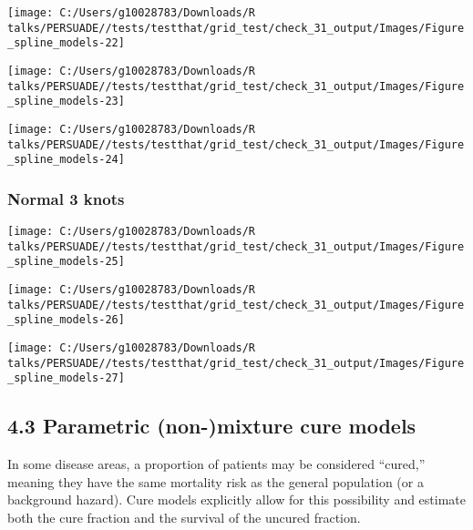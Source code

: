 \documentclass[
]{article}
\begin{document}
\begin{flushleft}\texttt{[image: C:/Users/g10028783/Downloads/R talks/PERSUADE//tests/testthat/grid\_test/check\_31\_output/Images/Figure\_spline\_models-22]} \end{flushleft}

\begin{flushleft}\texttt{[image: C:/Users/g10028783/Downloads/R talks/PERSUADE//tests/testthat/grid\_test/check\_31\_output/Images/Figure\_spline\_models-23]} \end{flushleft}

\begin{flushleft}\texttt{[image: C:/Users/g10028783/Downloads/R talks/PERSUADE//tests/testthat/grid\_test/check\_31\_output/Images/Figure\_spline\_models-24]} \end{flushleft}

\clearpage

\subsubsection{Normal 3 knots}\label{normal-3-knots}

\begin{flushleft}\texttt{[image: C:/Users/g10028783/Downloads/R talks/PERSUADE//tests/testthat/grid\_test/check\_31\_output/Images/Figure\_spline\_models-25]} \end{flushleft}

\begin{flushleft}\texttt{[image: C:/Users/g10028783/Downloads/R talks/PERSUADE//tests/testthat/grid\_test/check\_31\_output/Images/Figure\_spline\_models-26]} \end{flushleft}

\begin{flushleft}\texttt{[image: C:/Users/g10028783/Downloads/R talks/PERSUADE//tests/testthat/grid\_test/check\_31\_output/Images/Figure\_spline\_models-27]} \end{flushleft}

\clearpage

\subsection{4.3 Parametric (non-)mixture cure
models}\label{parametric-non-mixture-cure-models}

In some disease areas, a proportion of patients may be considered
``cured,'' meaning they have the same mortality risk as the general
population (or a background hazard). Cure models explicitly allow for
this possibility and estimate both the cure fraction and the survival of
the uncured fraction.
\end{document}
